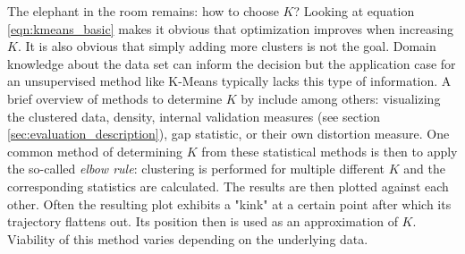 The elephant in the room remains: how to choose $K$? Looking at equation \ref{eqn:kmeans_basic} makes it obvious that optimization improves when increasing $K$. It is also obvious that simply adding more clusters is not the goal. Domain knowledge about the data set can inform the decision but the application case for an unsupervised method like K-Means typically lacks this type of information. A brief overview of methods to determine $K$ by \cite{pham2005selection, yuan2019research} include among others: visualizing the clustered data, density, internal validation measures (see section \ref{sec:evaluation_description}), gap statistic, or their own distortion measure. One common method of determining $K$ from these statistical methods is then to apply the so-called \textit{elbow rule}: clustering is performed for multiple different $K$ and the corresponding statistics are calculated. The results are then plotted against each other. Often the resulting plot exhibits a "kink" at a certain point after which its trajectory flattens out. Its position then is used as an approximation of $K$. Viability of this method varies depending on the underlying data.